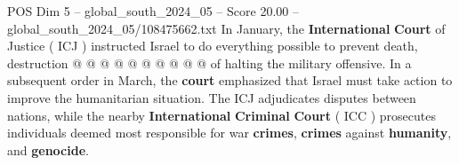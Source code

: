 \begin{textsample}{POS Dim 5 – global\_south\_2024\_05 – Score 20.00 – global\_south\_2024\_05/108475662.txt}
In January, the \textbf{International} \textbf{Court} of Justice ( ICJ ) instructed Israel to do everything possible to prevent death, destruction @ @ @ @ @ @ @ @ @ @ of halting the military offensive.
In a subsequent order in March, the \textbf{court} emphasized that Israel must take action to improve the humanitarian situation.
The ICJ adjudicates disputes between nations, while the nearby \textbf{International} \textbf{Criminal} \textbf{Court} ( ICC ) prosecutes individuals deemed most responsible for war \textbf{crimes}, \textbf{crimes} against \textbf{humanity}, and \textbf{genocide}.

\end{textsample}
